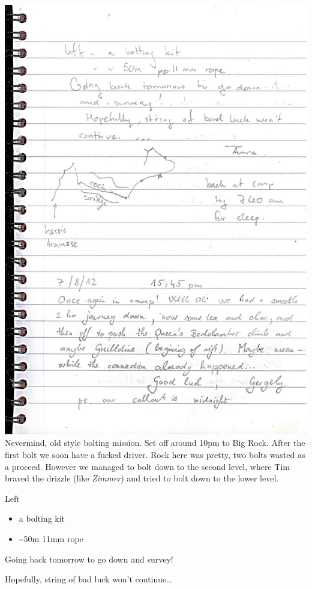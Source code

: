 \includegraphics{UgLog1012/87.jpeg}Nevermind, old style bolting mission.
Set off around 10pm to Big Rock. After the first bolt we soon have a
fucked driver. Rock here was pretty, two bolts wasted as a proceed.
However we managed to bolt down to the second level, where Tim braved
the drizzle (like \emph{Zimmer}) and tried to bolt down to the lower
level.

Left

\begin{itemize}
\tightlist
\item
  a bolting kit
\item
  \textasciitilde{}50m 11mm rope
\end{itemize}

Going back tomorrow to go down and survey!

Hopefully, string of bad luck won't continue\ldots{}

